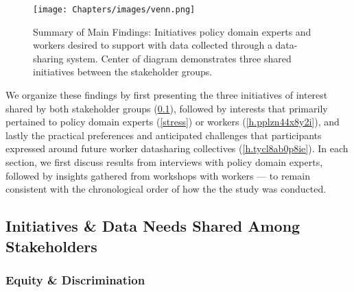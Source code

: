 \begin{figure}[h]
  \centering
  \texttt{[image: Chapters/images/venn.png]}
   \caption{Summary of Main Findings: Initiatives policy domain experts and workers desired to support with data collected through a data-sharing system. Center of diagram demonstrates three shared initiatives between the stakeholder groups.}

\end{figure}
\FloatBarrier

{We organize these findings by first presenting the three initiatives of interest shared by both stakeholder groups (\ref{shared}), followed by interests that primarily pertained to policy domain experts (\ref{stress}) or workers (\ref{h.pplzn44x8y2i}), and lastly the practical preferences and anticipated challenges that participants expressed around future worker datasharing collectives (\ref{h.tycl8ab0p8ie}). In each section, we first discuss results from interviews with policy domain experts, followed by insights gathered from workshops with workers --- to remain consistent with the chronological order of how the the study was conducted.}


\subsection{Initiatives \& Data Needs Shared Among Stakeholders}\label{shared}

\subsubsection{Equity \& Discrimination}\label{pde_disc}
